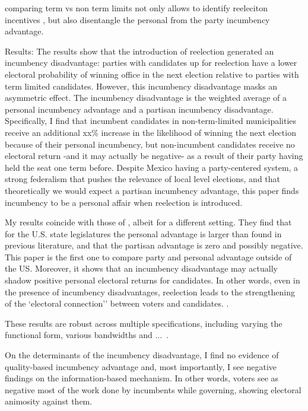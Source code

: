 \documentclass[12pt]{amsart}
\numberwithin{equation}{section}
\theoremstyle{definition}
\theoremstyle{definition}
\theoremstyle{definition}
\begin{document}
comparing term vs non term limits not only allows to identify reeleciton incentives \citep{ashworth_2012}, but also disentangle the personal from the party incumbency advantage. 


Results: 
The results show that the introduction of reelection generated an incumbency disadvantage: parties with candidates up for reelection have a lower electoral probability of winning office in the next election relative to parties with term limited candidates. However, this incumbency disadvantage masks an asymmetric effect. The incumbency disadvantage is the weighted average of a personal incumbency advantage and a partisan incumbency disadvantage. Specifically, I find that incumbent candidates in non-term-limited municipalities receive an additional xx\% increase in the likelihood of winning the next election because of their personal incumbency, but non-incumbent candidates receive no electoral return -and it may actually be negative- as a result of their party having held the seat one term before. Despite Mexico having a party-centered system, a strong federalism that pushes the relevance of local level elections, and that theoretically we would expect a partisan incumbency advantage, this paper finds incumbency to be a personal affair when reelection is introduced. 

My results coincide with those of \citep{fowler_hall_2014}, albeit for a different setting. They find that for the U.S. state legislatures the personal advantage is larger than found in previous literature, and that the partisan advantage is zero and possibly negative. This paper is the first one to compare party and personal advantage outside of the US. Moreover, it shows that an incumbency disadvantage may actually shadow positive personal electoral returns for candidates. In other words, even in the presence of incumbency disadvantages, reelection leads to the strengthening of the `electoral connection'' between voters and candidates. \citep{mayhew_1974}. 

These results are robust across multiple specifications, including varying the functional form, various bandwidths and ... . 

On the determinants of the incumbency disadvantage, I find no evidence of quality-based incumbency advantage and, most importantly, I see negative findings on the information-based mechanism. In other words, voters see as negative most of the work done by incumbents while governing, showing electoral animosity against them.
 
\end{document}
